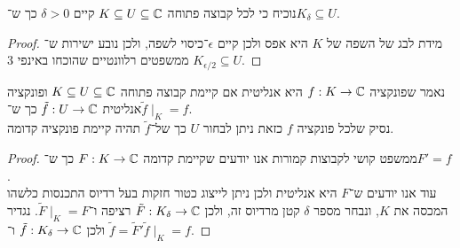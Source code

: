 \subquestion{}
נוכיח כי לכל קבוצה פתוחה $K \subseteq U \subseteq \mathbb{C}$ קיים $\delta > 0$ כך ש־$K_\delta \subseteq U$.
\begin{proof}
	מידת לבג של השפה של $K$ היא אפס ולכן קיים $\epsilon$־כיסוי לשפה, ולכן נובע ישירות ש־$K_{\epsilon / 2} \subseteq U$ ממשפטים רלוונטיים שהוכחו באינפי 3.
\end{proof}

\subquestion{}
נאמר שפונקציה $f : K \to \mathbb{C}$ היא אנליטית אם קיימת קבוצה פתוחה $K \subseteq U \subseteq \mathbb{C}$ ופונקציה אנליטית  $\tilde{f} : U \to \mathbb{C}$ כך ש־$\tilde{f} \mid_K = f$. \\
נסיק שלכל פונקציה $f$ כזאת ניתן לבחור $U$ כך של־$\tilde{f}$ תהיה קיימת פונקציה קדומה.
\begin{proof}
	ממשפט קושי לקבוצות קמורות אנו יודעים שקיימת קדומה $F : K \to \mathbb{C}$ כך ש־$F' = f$. \\
	עוד אנו יודעים ש־$F$ היא אנליטית ולכן ניתן לייצוג כטור חזקות בעל רדיוס התכנסות כלשהו המכסה את $K$, ונבחר מספר $\delta$ קטן מרדיוס זה, ולכן $\tilde{F} : K_\delta \to \mathbb{C}$ רציפה ו־$\tilde{F} \mid_K = F$.
	נגדיר $\tilde{f} = \tilde{F}'$ ולכן $\tilde{f} : K_\delta \to \mathbb{C}$ ו־$\tilde{f} \mid_K = f$.
\end{proof}


